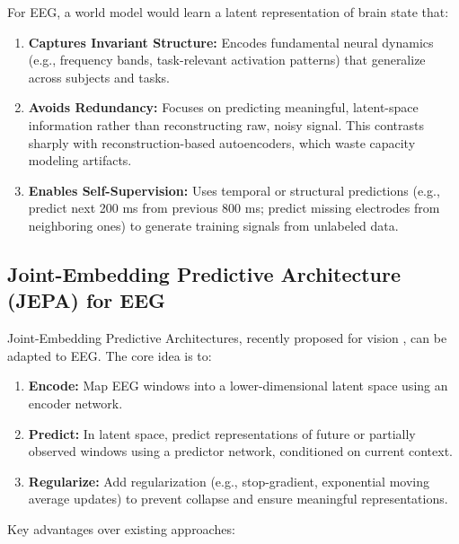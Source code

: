 \documentclass[11pt]{article}
\begin{document}
For EEG, a world model would learn a latent representation of brain state that:

\begin{enumerate}
    \item \textbf{Captures Invariant Structure:} Encodes fundamental neural dynamics (e.g., frequency bands, task-relevant activation patterns) that generalize across subjects and tasks.
    
    \item \textbf{Avoids Redundancy:} Focuses on predicting meaningful, latent-space information rather than reconstructing raw, noisy signal. This contrasts sharply with reconstruction-based autoencoders, which waste capacity modeling artifacts.
    
    \item \textbf{Enables Self-Supervision:} Uses temporal or structural predictions (e.g., predict next 200 ms from previous 800 ms; predict missing electrodes from neighboring ones) to generate training signals from unlabeled data.
\end{enumerate}

\subsection{Joint-Embedding Predictive Architecture (JEPA) for EEG}

Joint-Embedding Predictive Architectures, recently proposed for vision \citep{lecun2022world}, can be adapted to EEG. The core idea is to:

\begin{enumerate}
    \item \textbf{Encode:} Map EEG windows into a lower-dimensional latent space using an encoder network.
    
    \item \textbf{Predict:} In latent space, predict representations of future or partially observed windows using a predictor network, conditioned on current context.
    
    \item \textbf{Regularize:} Add regularization (e.g., stop-gradient, exponential moving average updates) to prevent collapse and ensure meaningful representations.
\end{enumerate}

Key advantages over existing approaches:
\end{document}
